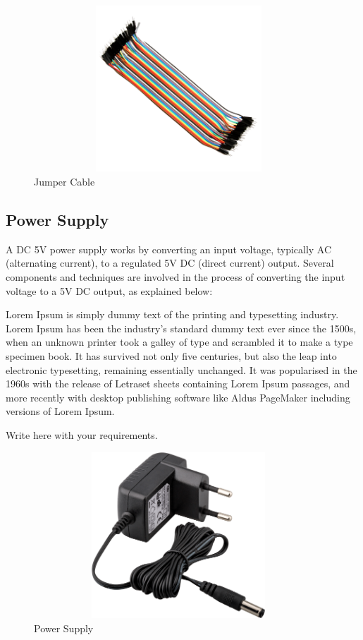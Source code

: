 	\begin{figure}[H]
	\centering
	\includegraphics[width=10.86cm,height=6.23cm]{./images/image9.png}
        \caption{Jumper Cable}

	\end{figure}
   
 \subsection{Power Supply} A DC 5V power supply works by converting an input voltage, typically AC (alternating current), to a regulated 5V DC (direct current) output. Several components and techniques are involved in the process of converting the input voltage to a 5V DC output, as explained below:


Lorem Ipsum is simply dummy text of the printing and typesetting industry. Lorem Ipsum has been the industry's standard dummy text ever since the 1500s, when an unknown printer took a galley of type and scrambled it to make a type specimen book. It has survived not only five centuries, but also the leap into electronic typesetting, remaining essentially unchanged. It was popularised in the 1960s with the release of Letraset sheets containing Lorem Ipsum passages, and more recently with desktop publishing software like Aldus PageMaker including versions of Lorem Ipsum.
	\vspace{3\baselineskip}
    \begin{center}
        \Large Write here with your requirements.
    \end{center}
	\vspace{3\baselineskip}
	
	\begin{figure}[H]
	\centering
	\includegraphics[width=10.86cm,height=6.23cm]{./images/image10.png}
        \caption{Power Supply}

	\end{figure}


